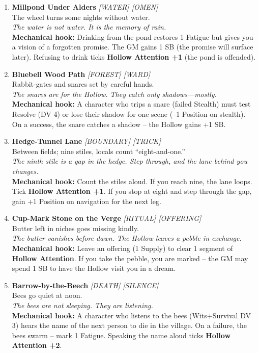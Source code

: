 \begin{enumerate}
\item \textbf{Millpond Under Alders} \hfill \textit{[WATER] [OMEN]} \\
  The wheel turns some nights without water. \\
  \textit{The water is not water. It is the memory of rain.} \\
  \textbf{Mechanical hook:} Drinking from the pond restores 1 Fatigue but gives you a vision of a forgotten promise. The GM gains 1 SB (the promise will surface later). Refusing to drink ticks \textbf{Hollow Attention +1} (the pond is offended).

\item \textbf{Bluebell Wood Path} \hfill \textit{[FOREST] [WARD]} \\
  Rabbit-gates and snares set by careful hands. \\
  \textit{The snares are for the Hollow. They catch only shadows---mostly.} \\
  \textbf{Mechanical hook:} A character who trips a snare (failed Stealth) must test Resolve (DV 4) or lose their shadow for one scene (--1 Position on stealth). On a success, the snare catches a shadow -- the Hollow gains +1 SB.

\item \textbf{Hedge-Tunnel Lane} \hfill \textit{[BOUNDARY] [TRICK]} \\
  Between fields; nine stiles, locals count ``eight-and-one.'' \\
  \textit{The ninth stile is a gap in the hedge. Step through, and the lane behind you changes.} \\
  \textbf{Mechanical hook:} Count the stiles aloud. If you reach nine, the lane loops. Tick \textbf{Hollow Attention +1}. If you stop at eight and step through the gap, gain +1 Position on navigation for the next leg.

\item \textbf{Cup-Mark Stone on the Verge} \hfill \textit{[RITUAL] [OFFERING]} \\
  Butter left in niches goes missing kindly. \\
  \textit{The butter vanishes before dawn. The Hollow leaves a pebble in exchange.} \\
  \textbf{Mechanical hook:} Leave an offering (1 Supply) to clear 1 segment of \textbf{Hollow Attention}. If you take the pebble, you are marked -- the GM may spend 1 SB to have the Hollow visit you in a dream.

\item \textbf{Barrow-by-the-Beech} \hfill \textit{[DEATH] [SILENCE]} \\
  Bees go quiet at noon. \\
  \textit{The bees are not sleeping. They are listening.} \\
  \textbf{Mechanical hook:} A character who listens to the bees (Wits+Survival DV 3) hears the name of the next person to die in the village. On a failure, the bees swarm -- mark 1 Fatigue. Speaking the name aloud ticks \textbf{Hollow Attention +2}.


\end{enumerate}
